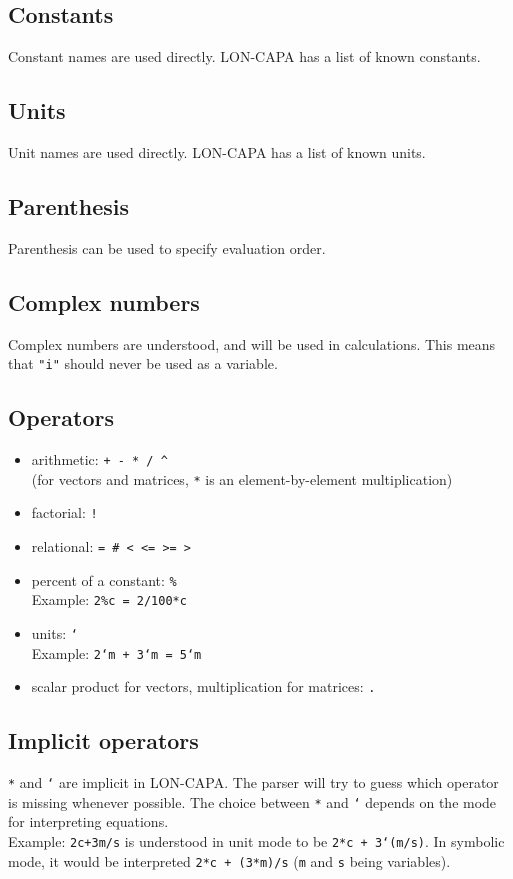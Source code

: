 \subsection{Constants}
Constant names are used directly. LON-CAPA has a list of known constants.

\subsection{Units}
Unit names are used directly. LON-CAPA has a list of known units.

\subsection{Parenthesis}
Parenthesis can be used to specify evaluation order.

\subsection{Complex numbers}
Complex numbers are understood, and will be used in calculations.
This means that \texttt{"i"} should never be used as a variable.

\subsection{Operators}
\begin{itemize}
\item arithmetic: \texttt{+ - * / \^}\\
(for vectors and matrices, \texttt{*} is an element-by-element multiplication)
\item factorial: \texttt{!}
\item relational: \texttt{= \# < <= >= >}
\item percent of a constant: \texttt{\%}\\
Example: \texttt{2\%c = 2/100*c}
\item units: \texttt{`}\\
Example: \texttt{2`m + 3`m = 5`m}
\item scalar product for vectors, multiplication for matrices: \texttt{.}
\end{itemize}

\subsection{Implicit operators}
\texttt{*} and \texttt{`} are implicit in LON-CAPA.
The parser will try to guess which operator is missing whenever possible.
The choice between \texttt{*} and \texttt{`} depends on the mode for interpreting equations.\\
Example: \texttt{2c+3m/s} is understood in unit mode to be \texttt{2*c + 3`(m/s)}.
In symbolic mode, it would be interpreted \texttt{2*c + (3*m)/s} (\texttt{m} and \texttt{s} being variables).

